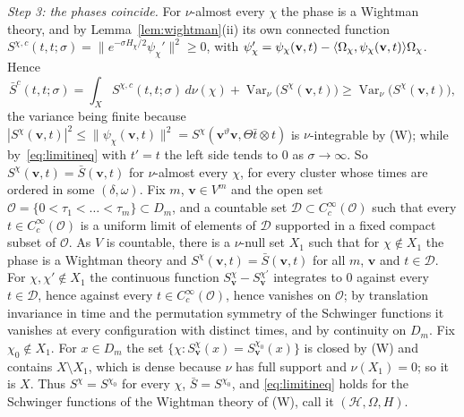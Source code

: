 \emph{Step 3: the phases coincide.} For $\nu$-almost every $\chi$ the phase is
a Wightman theory, and by Lemma~\ref{lem:wightman}(ii) its own connected
function $S^{\chi,c}(t,t;\sigma)=\|e^{-\sigma H_\chi/2}\psi_\chi'\|^2\ge0$, with
$\psi'_\chi=\psi_\chi(\mathbf v,t)-\langle \Omega_\chi,\psi_\chi(\mathbf v,t)\rangle
\Omega_\chi$. Hence
\[
\bar S^c(t,t;\sigma)=\int_XS^{\chi,c}(t,t;\sigma)\,d\nu(\chi)+\operatorname{Var}_\nu
\bigl(S^\chi(\mathbf v,t)\bigr)\ge\operatorname{Var}_\nu\bigl(S^\chi(\mathbf v,t)\bigr),
\]
the variance being finite because $|S^\chi(\mathbf v,t)|^2\le\|\psi_\chi
(\mathbf v,t)\|^2=S^\chi(\mathbf v^\vartheta\mathbf v,\Theta\bar t\otimes t)$ is
$\nu$-integrable by (W); while by~\eqref{eq:limitineq} with $t'=t$ the left
side tends to $0$ as $\sigma\to\infty$. So $S^\chi(\mathbf v,t)=\bar S(\mathbf v,t)$
for $\nu$-almost every $\chi$, for every cluster whose times are ordered in
some $(\delta,\omega)$. Fix $m$, $\mathbf v\in V^m$ and the open set
$\mathcal O=\{0<\tau_1<\dots<\tau_m\}\subset D_m$, and a countable set
$\mathcal D\subset C^\infty_c(\mathcal O)$ such that every $t\in C^\infty_c
(\mathcal O)$ is a uniform limit of elements of $\mathcal D$ supported in a
fixed compact subset of $\mathcal O$. As $V$ is countable, there is a
$\nu$-null set $X_1$ such that for $\chi\notin X_1$ the phase is a Wightman
theory and $S^\chi(\mathbf v,t)=\bar S(\mathbf v,t)$ for all $m$, $\mathbf v$
and $t\in\mathcal D$. For $\chi,\chi'\notin X_1$ the continuous function
$S^\chi_{\mathbf v}-S^{\chi'}_{\mathbf v}$ integrates to $0$ against every
$t\in\mathcal D$, hence against every $t\in C^\infty_c(\mathcal O)$, hence
vanishes on $\mathcal O$; by translation invariance in time and the
permutation symmetry of the Schwinger functions it vanishes at every
configuration with distinct times, and by continuity on $D_m$. Fix $\chi_0
\notin X_1$. For $x\in D_m$ the set $\{\chi:S^\chi_{\mathbf v}(x)=
S^{\chi_0}_{\mathbf v}(x)\}$ is closed by (W) and contains $X\setminus X_1$,
which is dense because $\nu$ has full support and $\nu(X_1)=0$; so it is
$X$. Thus $S^\chi=S^{\chi_0}$ for every $\chi$, $\bar S=S^{\chi_0}$, and
\eqref{eq:limitineq} holds for the Schwinger functions of the Wightman theory
of (W), call it $(\mathcal H,\Omega,H)$.

